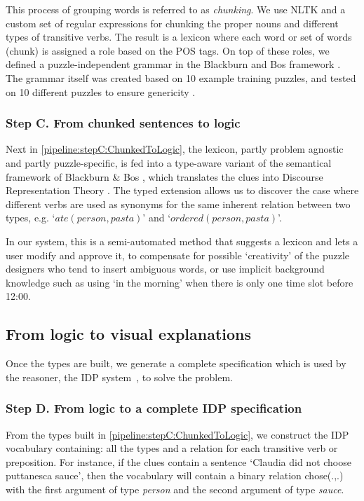 This process of grouping words is referred to as \textit{chunking}. 
We use NLTK and a custom set of regular expressions for chunking the proper nouns and different types of transitive verbs.
The result is a lexicon where each word or set of words (chunk) is assigned a role based on the POS tags.  
On top of these roles, we defined a puzzle-independent grammar in the Blackburn and Bos framework \cite{Blackburn2005,Blackburn2006}.
The grammar itself was created based on 10 example training puzzles, and tested on 10 different puzzles to ensure genericity \cite{msc/Claes17}. 

\subsubsection*{Step C. From chunked sentences to logic} Next in \ref{pipeline:stepC:ChunkedToLogic}, the lexicon, partly problem agnostic and partly puzzle-specific, is fed into a type-aware variant of the semantical framework of Blackburn \& Bos \cite{Blackburn2005,Blackburn2006}, which translates the clues into Discourse Representation Theory \cite{DRT}.
The typed extension allows us to discover the case where different verbs are used as synonyms for the same inherent relation between two types, e.g. `$ate(person, pasta)$' and `$ordered(person, pasta)$'.

In our system, this is a semi-automated method that suggests a lexicon and lets a user modify and approve it, to compensate for possible `creativity' of the puzzle designers who tend to insert ambiguous words, or use implicit background knowledge such as using `in the morning' when there is only one time slot before 12:00.

\subsection{From logic to visual explanations}\label{sec:pipeline:IDPtoExplanations}
Once the types are built, we generate a complete specification which is used by the reasoner, the IDP system~\cite{IDP}, to solve the problem. 

\subsubsection*{Step D. From logic to a complete IDP specification}
From the types built in \ref{pipeline:stepC:ChunkedToLogic}, we construct the IDP vocabulary containing: all the types and a relation for each transitive verb or preposition. 
For instance, if the clues contain a sentence `Claudia did not choose puttanesca sauce', then the vocabulary will contain a binary relation chose(.,.) with the first argument of type \textit{person} and the second argument of type \textit{sauce}.

